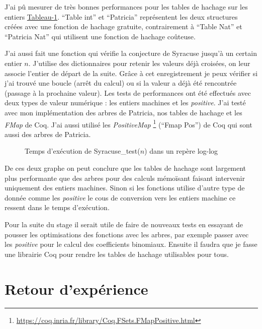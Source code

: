 \documentclass{article}
\begin{document}
J'ai pû mesurer de très bonnes performances pour les tables de hachage
sur les entiers \hyperref[fig:pascal]{Tableau-1}. ``Table int'' et ``Patricia''
représentent les deux structures créées avec une fonction de hachage gratuite,
contrairement à ``Table Nat'' et ``Patricia Nat'' qui utilisent une fonction de
hachage coûteuse.

\newpage

  J'ai aussi fait une fonction qui vérifie la conjecture de Syracuse
jusqu'à un certain entier $n$. J'utilise des dictionnaires pour retenir les
valeurs déjà croisées, on leur associe l'entier de départ de la suite. Grâce à cet
enregistrement je peux vérifier si j'ai trouvé une boucle (arrêt du
calcul) ou si la valeur a déjà été rencontrée (passage à la prochaine valeur).
Les tests de performances ont été effectués avec deux types de valeur numérique :
les entiers machines et les \textit{positive}. J'ai testé avec mon implémentation
des arbres de Patricia, nos tables de hachage et les \textit{FMap} de Coq. J'ai
aussi utilisé les \textit{PositiveMap}
\footnote{\url{https://coq.inria.fr/library/Coq.FSets.FMapPositive.html}}
(``Fmap Pos'') de Coq qui sont aussi des arbres de Patricia.

\begin{figure}[ht]
  \centering
  \scalebox{.7}{}
  \caption{Temps d'exécution de Syracuse\_test($n$) dans un repère log-log}
  \label{fig:syracuse}
\end{figure}

  De ces deux graphe on peut conclure que les tables de hachage sont largement
plus performante que des arbres pour des calculs mémoïsant faisant intervenir
uniquement des entiers machines. Sinon si les fonctions utilise d'autre type de
donnée comme les \textit{positive} le cous de conversion vers les entiers
machine ce ressent dans le temps d'exécution.

  Pour la suite du stage il serait utile de faire de nouveaux tests en essayant
de pousser les optimisations des fonctions avec les arbres, par exemple passer
avec les \textit{positive} pour le calcul des coefficients binomiaux. Ensuite il
faudra que je fasse une librairie Coq pour rendre les tables de hachage
utilisables pour tous.

  \newpage
  \section{Retour d'expérience}
\end{document}
